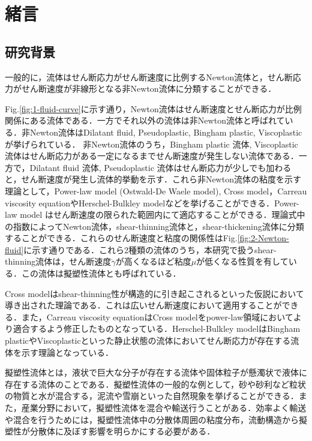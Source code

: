 \section{緒言}

\subsection{研究背景}

一般的に，流体はせん断応力がせん断速度に比例するNewton流体と，せん断応力がせん断速度が非線形となる非Newton流体に分類することができる．

Fig.\ref{fig:1-fluid-curve}に示す通り，Newton流体はせん断速度とせん断応力が比例関係にある流体である．一方でそれ以外の流体は非Newton流体と呼ばれている．非Newton流体はDilatant fluid, Pseudoplastic, Bingham plastic, Viscoplastic が挙げられている．
非Newton流体のうち，Bingham plastic 流体, Viscoplastic 流体はせん断応力がある一定になるまでせん断速度が発生しない流体である．一方で，Dilatant fluid 流体, Pseudoplastic 流体はせん断応力が少しでも加わると，せん断速度が発生し流体的挙動を示す．これら非Newton流体の粘度を示す理論として，Power-law model (Ostwald-De Waele model), Cross model，Carreau viscosity equationやHerschel-Bulkley modelなどを挙げることができる\cite{ref:1}．Power-law model はせん断速度の限られた範囲内にて適応することができる．理論式中の指数によってNewton流体，shear-thinning流体と，shear-thickening流体に分類することができる．これらのせん断速度と粘度の関係性はFig.\ref{fig:2-Newton-fluid}に示す通りである．これら2種類の流体のうち，本研究で扱うshear-thinning流体は，せん断速度$\dot{\gamma}$が高くなるほど粘度$\mu$が低くなる性質を有している．この流体は擬塑性流体とも呼ばれている．

Cross modelはshear-thinning性が構造的に引き起こされるといった仮説において導き出された理論である．これは広いせん断速度において適用することができる．また，Carreau viscosity equationはCross modelをpower-law領域においてより適合するよう修正したものとなっている．Herschel-Bulkley modelはBingham plasticやViscoplasticといった静止状態の流体においてせん断応力が存在する流体を示す理論となっている\cite{ref:1}．

擬塑性流体とは，液状で巨大な分子が存在する流体や固体粒子が懸濁状で液体に存在する流体のことである．擬塑性流体の一般的な例として，砂や砂利など粒状の物質と水が混合する，泥流や雪崩といった自然現象を挙げることができる．また，産業分野において，擬塑性流体を混合や輸送行うことがある．効率よく輸送や混合を行うためには，擬塑性流体中の分散体周囲の粘度分布，流動構造から擬塑性が分散体に及ぼす影響を明らかにする必要がある．

